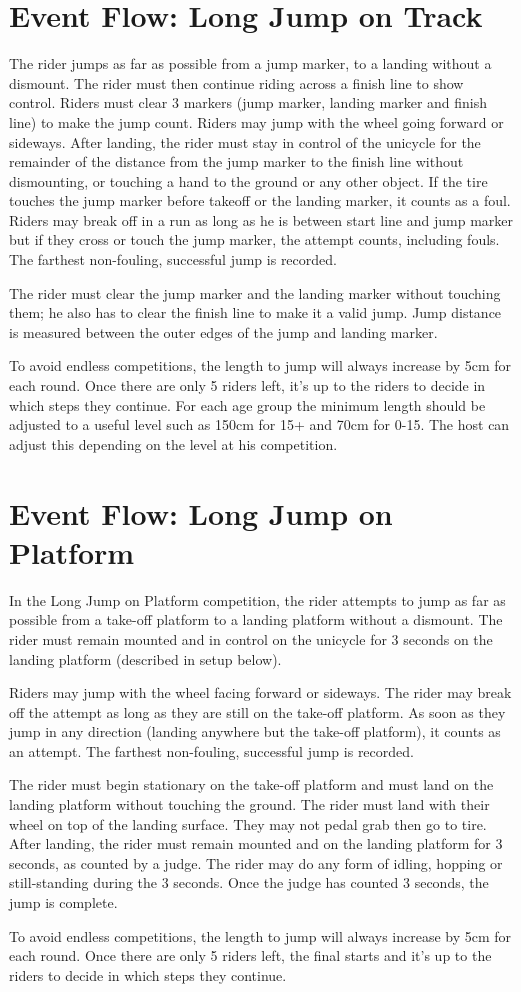 \section{Event Flow: Long Jump on Track}
The rider jumps as far as possible from a jump marker, to a landing without a dismount.
The rider must then continue riding across a finish line to show control.
Riders must clear 3 markers (jump marker, landing marker and finish line) to make the jump count.
Riders may jump with the wheel going forward or sideways.
After landing, the rider must stay in control of the unicycle for the remainder of the distance from the jump marker to the finish line without dismounting, or touching a hand to the ground or any other object.
If the tire touches the jump marker before takeoff or the landing marker, it counts as a foul.
Riders may break off in a run as long as he is between start line and jump marker but if they cross or touch the jump marker, the attempt counts, including fouls.
The farthest non-fouling, successful jump is recorded.

The rider must clear the jump marker and the landing marker without touching them; he also has to clear the finish line to make it a valid jump.
Jump distance is measured between the outer edges of the jump and landing marker.

To avoid endless competitions, the length to jump will always increase by 5cm for each round.
Once there are only 5 riders left, it's up to the riders to decide in which steps they continue.
For each age group the minimum length should be adjusted to a useful level such as 150cm for 15+ and 70cm for 0-15.
The host can adjust this depending on the level at his competition.

\section{Event Flow: Long Jump on Platform}
In the Long Jump on Platform competition, the rider attempts to jump as far as possible from a take-off platform to a landing platform without a dismount.
The rider must remain mounted and in control on the unicycle for 3 seconds on the landing platform (described in setup below).

Riders may jump with the wheel facing forward or sideways.
The rider may break off the attempt as long as they are still on the take-off platform.
As soon as they jump in any direction (landing anywhere but the take-off platform), it counts as an attempt.
The farthest non-fouling, successful jump is recorded.

The rider must begin stationary on the take-off platform and must land on the landing platform without touching the ground.
The rider must land with their wheel on top of the landing surface.
They may not pedal grab then go to tire.
After landing, the rider must remain mounted and on the landing platform for 3 seconds, as counted by a judge.
The rider may do any form of idling, hopping or still-standing during the 3 seconds.
Once the judge has counted 3 seconds, the jump is complete.

To avoid endless competitions, the length to jump will always increase by 5cm for each round.
Once there are only 5 riders left, the final starts and it's up to the riders to decide in which steps they continue.
